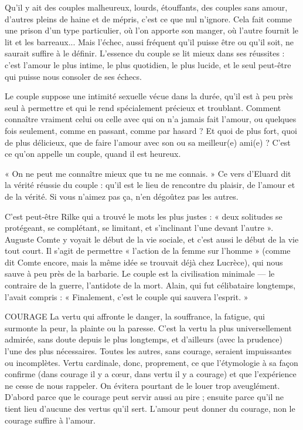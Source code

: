 Qu'il y ait des couples malheureux, lourds, étouffants, des couples sans
amour, d’autres pleins de haine et de mépris, c’est ce que nul n’ignore. Cela fait
comme une prison d’un type particulier, où l’on apporte son manger, où
l'autre fournit le lit et les barreaux... Mais l'échec, aussi fréquent qu’il puisse
être ou qu’il soit, ne saurait suffire à le définir. L’essence du couple se lit mieux
dans ses réussites : c’est l’amour le plus intime, le plus quotidien, le plus lucide,
et le seul peut-être qui puisse nous consoler de ses échecs.

Le couple suppose une intimité sexuelle vécue dans la durée, qu’il est à peu
près seul à permettre et qui le rend spécialement précieux et troublant. Comment
connaître vraiment celui ou celle avec qui on n’a jamais fait l'amour, ou
quelques fois seulement, comme en passant, comme par hasard ? Et quoi de
plus fort, quoi de plus délicieux, que de faire l’amour avec son ou sa meilleur(e)
ami(e) ? C’est ce qu’on appelle un couple, quand il est heureux.

« On ne peut me connaître mieux que tu ne me connais. » Ce vers d’Eluard
dit la vérité réussie du couple : qu’il est le lieu de rencontre du plaisir, de
l'amour et de la vérité. Si vous n’aimez pas ça, n’en dégoûtez pas les autres.

C’est peut-être Rilke qui a trouvé le mots les plus justes : « deux solitudes
se protégeant, se complétant, se limitant, et s’inclinant l’une devant l’autre ».
Auguste Comte y voyait le début de la vie sociale, et c’est aussi le début de la
vie tout court. Il s’agit de permettre « l’action de la femme sur l’homme »
(comme dit Comte encore, mais la même idée se trouvait déjà chez Lucrèce),
qui nous sauve à peu près de la barbarie. Le couple est la civilisation minimale
— le contraire de la guerre, l’antidote de la mort. Alain, qui fut célibataire longtemps,
l’avait compris : « Finalement, c’est le couple qui sauvera l’esprit. »

COURAGE La vertu qui affronte le danger, la souffrance, la fatigue, qui
surmonte la peur, la plainte ou la paresse. C’est la vertu la plus
universellement admirée, sans doute depuis le plus longtemps, et d’ailleurs
(avec la prudence) l’une des plus nécessaires. Toutes les autres, sans courage,
seraient impuissantes ou incomplètes. Vertu cardinale, donc, proprement, ce
que l’étymologie à sa façon confirme (dans courage il y a cœur, dans vertu il y
a courage) et que l'expérience ne cesse de nous rappeler. On évitera pourtant de
le louer trop aveuglément. D’abord parce que le courage peut servir aussi au
pire ; ensuite parce qu’il ne tient lieu d’aucune des vertus qu’il sert. L'amour
peut donner du courage, non le courage suffire à l'amour.


